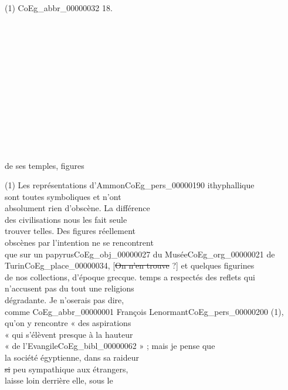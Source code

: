 \documentclass{book}
\begin{document}
{\begin{paracol}{2}
\noindent \\
\\
\\
(1) \gls{CoEg_abbr_00000032} 18.\\
\\
\\
\\
\\
\\
\\
\\
\\
\\
\\
\\
\\
\begin{flushright} de ses temples, figures \end{flushright} 
\noindent (1) Les représentations d’Ammon\gls{CoEg_pers_00000190} ithyphallique\\
sont toutes symboliques et n’ont\\
absolument rien d’obscène. La différence\\
des civilisations nous les fait seule\\
trouver telles. Des figures réellement\\
obscènes par l’intention ne se rencontrent\\
que sur un papyrus\gls{CoEg_obj_00000027} du Musée\gls{CoEg_org_00000021} de\\
Turin\gls{CoEg_place_00000034}, [\sout{On n’en trouve} ?] et quelques figurines\\
de nos collections, d’époque grecque.
\switchcolumn
\noindent temps a respectés des reflets qui\\
n’accusent pas du tout une religions\\
dégradante. Je n’oserais pas dire,\\
comme \gls{CoEg_abbr_00000001} François Lenormant\gls{CoEg_pers_00000200} (1),\\
qu’on y rencontre « des aspirations\\
« qui s’élèvent presque à la hauteur\\
« de l’Evangile\gls{CoEg_bibl_00000062} » ; mais je pense que\\
la société égyptienne, dans sa raideur\\
\sout{si} peu sympathique aux étrangers,\\
laisse loin derrière elle, sous le\\

\end{paracol}}
\end{document}
